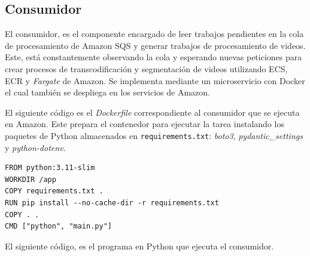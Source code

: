 \subsection{Consumidor}

El consumidor, es el componente encargado de leer trabajos pendientes en la cola de procesamiento de Amazon SQS y generar trabajos de procesamiento de videos. Este, está constantemente observando la cola y esperando nuevas peticiones para crear procesos de transcodificación y segmentación de videos utilizando ECS, ECR y \textit{Fargate} de Amazon. Se implementa mediante un microservicio con Docker el cual también se despliega en los servicios de Amazon. 

El siguiente código es el \textit{Dockerfile} correspondiente al consumidor que se ejecuta en Amazon. Este prepara el contenedor para ejecutar la tarea instalando los paquetes de Python almacenados en \texttt{requirements.txt}: \textit{boto3}, \textit{pydantic\_settings} y \textit{python-dotenv}.

\begin{lstlisting}[language=docker]
FROM python:3.11-slim
WORKDIR /app
COPY requirements.txt .
RUN pip install --no-cache-dir -r requirements.txt
COPY . .
CMD ["python", "main.py"]

\end{lstlisting}

El siguiente código, es el programa en Python que ejecuta el consumidor. 


